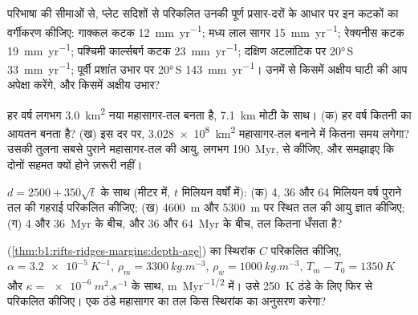 \begin{exercise}[$\star$]\label{exo:b1:rifts-ridges-margins:3}
परिभाषा की सीमाओं से, प्लेट सदिशों से परिकलित उनकी पूर्ण प्रसार-दरों के आधार पर इन कटकों का वर्गीकरण कीजिए: गाक्कल कटक \qty{12}{mm.yr^{-1}}; मध्य लाल सागर \qty{15}{mm.yr^{-1}}; रेक्यनीस कटक \qty{19}{mm.yr^{-1}}; पश्चिमी कार्ल्सबर्ग कटक \qty{23}{mm.yr^{-1}}; दक्षिण अटलांटिक पर \ang{20}\,S \qty{33}{mm.yr^{-1}}; पूर्वी प्रशांत उभार पर \ang{20}\,S \qty{143}{mm.yr^{-1}}। उनमें से किसमें अक्षीय घाटी की आप अपेक्षा करेंगे, और किसमें अक्षीय उभार?
\end{exercise}

\begin{exercise}[$\star$]\label{exo:b1:rifts-ridges-margins:4}
हर वर्ष लगभग \qty{3.0}{km^2} नया महासागर-तल बनता है, \qty{7.1}{km} मोटी  के साथ। (क) हर वर्ष कितनी  का आयतन बनता है? (ख) इस दर पर, \qty{3.028e8}{km^2} महासागर-तल बनाने में कितना समय लगेगा? उसकी तुलना सबसे पुराने महासागर-तल की आयु, लगभग \qty{190}{Myr}, से कीजिए, और समझाइए कि दोनों सहमत क्यों होने ज़रूरी नहीं।
\end{exercise}

\begin{exercise}[$\star\star$]\label{exo:b1:rifts-ridges-margins:5}
$d = 2500 + 350\sqrt t$ के साथ (मीटर में, $t$ मिलियन वर्षों में): (क) 4, 36 और 64 मिलियन वर्ष पुराने तल की गहराई परिकलित कीजिए; (ख) \qty{4600}{m} और \qty{5300}{m} पर स्थित तल की आयु ज्ञात कीजिए; (ग) 4 और \qty{36}{Myr} के बीच, और 36 और \qty{64}{Myr} के बीच, तल कितना धँसता है?
\end{exercise}

\begin{exercise}[$\star\star$]\label{exo:b1:rifts-ridges-margins:6}
 (\cref{thm:b1:rifts-ridges-margins:depth-age}) का स्थिरांक $C$ परिकलित कीजिए, $\alpha =
\qty{3.2e-5}{K^{-1}}$, $\rho_m = \qty{3300}{kg.m^{-3}}$, $\rho_w =
\qty{1000}{kg.m^{-3}}$, $T_m - T_0 = \qty{1350}{K}$ और $\kappa =
\qty{e-6}{m^2.s^{-1}}$ के साथ, \unit{m.Myr^{-1/2}} में। उसे \qty{250}{K} ठंडे  के लिए फिर से परिकलित कीजिए। एक ठंडे महासागर का तल किस स्थिरांक का अनुसरण करेगा?
\end{exercise}

